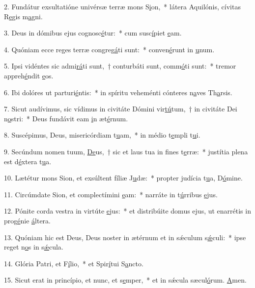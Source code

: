 2. Fundátur exsultatióne univérsæ terræ mons S\uline{i}on,~* látera Aquilónis, cívitas R\uline{e}gis m\uline{a}gni.\par 
3. Deus in dómibus ejus cognosc\uline{é}tur:~* cum susc\uline{í}piet \uline{e}am.\par 
4. Quóniam ecce reges terræ congreg\uline{á}ti sunt:~* conven\uline{é}runt in \uline{u}num.\par 
5. Ipsi vidéntes sic admi\uline{rá}ti sunt,~† conturbáti sunt, comm\uline{ó}ti sunt:~* tremor appreh\uline{é}ndit \uline{e}os.\par 
6. Ibi dolóres ut parturi\uline{é}ntis:~* in spíritu veheménti cónteres n\uline{a}ves Th\uline{a}rsis.\par 
7. Sicut audívimus, sic vídimus in civitáte Dómini vir\uline{tú}tum,~† in civitáte Dei n\uline{o}stri:~* Deus fundávit eam \uline{i}n æt\uline{é}rnum.\par 
8. Suscépimus, Deus, misericórdiam t\uline{u}am,~* in médio t\uline{e}mpli t\uline{u}i.\par 
9. Secúndum nomen tuum, \uline{De}us,~† sic et laus tua in fines t\uline{e}rræ:~* justítia plena est d\uline{é}xtera t\uline{u}a.\par 
10. Lætétur mons Sion, et exsúltent fíliæ J\uline{u}dæ:~* propter judícia t\uline{u}a, D\uline{ó}mine.\par 
11. Circúmdate Sion, et complectímini \uline{e}am:~* narráte in t\uline{ú}rribus \uline{e}jus.\par 
12. Pónite corda vestra in virtúte \uline{e}jus:~* et distribúite domus ejus, ut enarrétis in prog\uline{é}nie \uline{á}ltera.\par 
13. Quóniam hic est Deus, Deus noster in ætérnum et in sǽculum s\uline{ǽ}culi:~* ipse reget n\uline{o}s in s\uline{ǽ}cula.\par 
14. Glória Patri, et F\uline{í}lio,~* et Spir\uline{í}tui S\uline{a}ncto.\par 
15. Sicut erat in princípio, et nunc, et s\uline{e}mper,~* et in sǽcula sæcul\uline{ó}rum. \uline{A}men.\par 

